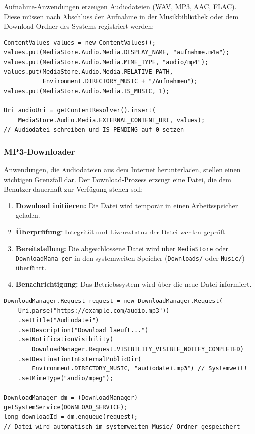 ﻿\documentclass[12pt, a4paper]{article}
\begin{document}
Aufnahme-Anwendungen erzeugen Audiodateien (WAV, MP3, AAC, FLAC). Diese müssen
nach Abschluss der Aufnahme in der Musikbibliothek oder dem Download-Ordner des
Systems registriert werden:

\begin{lstlisting}[style=android, caption={Audioaufnahme dem System bereitstellen}]
ContentValues values = new ContentValues();
values.put(MediaStore.Audio.Media.DISPLAY_NAME, "aufnahme.m4a");
values.put(MediaStore.Audio.Media.MIME_TYPE, "audio/mp4");
values.put(MediaStore.Audio.Media.RELATIVE_PATH,
           Environment.DIRECTORY_MUSIC + "/Aufnahmen");
values.put(MediaStore.Audio.Media.IS_MUSIC, 1);

Uri audioUri = getContentResolver().insert(
    MediaStore.Audio.Media.EXTERNAL_CONTENT_URI, values);
// Audiodatei schreiben und IS_PENDING auf 0 setzen
\end{lstlisting}

\subsubsection{MP3-Downloader}

Anwendungen, die Audiodateien aus dem Internet herunterladen, stellen einen wichtigen
Grenzfall dar. Der Download-Prozess erzeugt eine Datei, die dem Benutzer dauerhaft
zur Verfügung stehen soll:

\begin{enumerate}[label=\textbf{\arabic*:}]
  \item \textbf{Download initiieren:} Die Datei wird temporär in einen Arbeitsspeicher
    geladen.
  \item \textbf{Überprüfung:} Integrität und Lizenzstatus der Datei werden geprüft.
  \item \textbf{Bereitstellung:} Die abgeschlossene Datei wird über \texttt{MediaStore}
    oder \texttt{DownloadMana-\newline ger} in den systemweiten Speicher (\texttt{Downloads/}
    oder \texttt{Music/}) überführt.
  \item \textbf{Benachrichtigung:} Das Betriebssystem wird über die neue Datei
    informiert.
\end{enumerate}

\begin{lstlisting}[style=android, caption={Systemkonformer Datei-Download per DownloadManager}]
DownloadManager.Request request = new DownloadManager.Request(
    Uri.parse("https://example.com/audio.mp3"))
    .setTitle("Audiodatei")
    .setDescription("Download laeuft...")
    .setNotificationVisibility(
        DownloadManager.Request.VISIBILITY_VISIBLE_NOTIFY_COMPLETED)
    .setDestinationInExternalPublicDir(
        Environment.DIRECTORY_MUSIC, "audiodatei.mp3") // Systemweit!
    .setMimeType("audio/mpeg");

DownloadManager dm = (DownloadManager) getSystemService(DOWNLOAD_SERVICE);
long downloadId = dm.enqueue(request);
// Datei wird automatisch im systemweiten Music/-Ordner gespeichert
\end{lstlisting}
\end{document}
